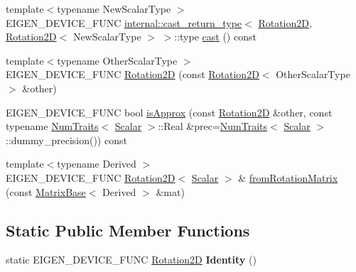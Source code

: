 \begin{DoxyCompactItemize}
\item 
{\footnotesize template$<$typename New\+Scalar\+Type $>$ }\\E\+I\+G\+E\+N\+\_\+\+D\+E\+V\+I\+C\+E\+\_\+\+F\+U\+NC \mbox{\hyperlink{struct_eigen_1_1internal_1_1cast__return__type}{internal\+::cast\+\_\+return\+\_\+type}}$<$ \mbox{\hyperlink{class_eigen_1_1_rotation2_d}{Rotation2D}}, \mbox{\hyperlink{class_eigen_1_1_rotation2_d}{Rotation2D}}$<$ New\+Scalar\+Type $>$ $>$\+::type \mbox{\hyperlink{class_eigen_1_1_rotation2_d_a7a2057f37733b0d153f542fffe8207cf}{cast}} () const
\item 
{\footnotesize template$<$typename Other\+Scalar\+Type $>$ }\\E\+I\+G\+E\+N\+\_\+\+D\+E\+V\+I\+C\+E\+\_\+\+F\+U\+NC \mbox{\hyperlink{class_eigen_1_1_rotation2_d_a28141c131bb66516477e07752278c139}{Rotation2D}} (const \mbox{\hyperlink{class_eigen_1_1_rotation2_d}{Rotation2D}}$<$ Other\+Scalar\+Type $>$ \&other)
\item 
E\+I\+G\+E\+N\+\_\+\+D\+E\+V\+I\+C\+E\+\_\+\+F\+U\+NC bool \mbox{\hyperlink{class_eigen_1_1_rotation2_d_ac70ab985fd67d3cc43ea75c33c01ae3a}{is\+Approx}} (const \mbox{\hyperlink{class_eigen_1_1_rotation2_d}{Rotation2D}} \&other, const typename \mbox{\hyperlink{struct_eigen_1_1_num_traits}{Num\+Traits}}$<$ \mbox{\hyperlink{class_eigen_1_1_rotation2_d_ac20c665ece0f197a712a2a39ae72e4e4}{Scalar}} $>$\+::Real \&prec=\mbox{\hyperlink{struct_eigen_1_1_num_traits}{Num\+Traits}}$<$ \mbox{\hyperlink{class_eigen_1_1_rotation2_d_ac20c665ece0f197a712a2a39ae72e4e4}{Scalar}} $>$\+::dummy\+\_\+precision()) const
\item 
{\footnotesize template$<$typename Derived $>$ }\\E\+I\+G\+E\+N\+\_\+\+D\+E\+V\+I\+C\+E\+\_\+\+F\+U\+NC \mbox{\hyperlink{class_eigen_1_1_rotation2_d}{Rotation2D}}$<$ \mbox{\hyperlink{class_eigen_1_1_rotation2_d_ac20c665ece0f197a712a2a39ae72e4e4}{Scalar}} $>$ \& \mbox{\hyperlink{class_eigen_1_1_rotation2_d_ab60bf3b2d7a33e8e29856f35839eba72}{from\+Rotation\+Matrix}} (const \mbox{\hyperlink{class_eigen_1_1_matrix_base}{Matrix\+Base}}$<$ Derived $>$ \&mat)
\end{DoxyCompactItemize}
\subsection*{Static Public Member Functions}
\begin{DoxyCompactItemize}
\item 
\mbox{\label{class_eigen_1_1_rotation2_d_a8bc2dda10d325f1ce5e1550e451bcd42}} 
static E\+I\+G\+E\+N\+\_\+\+D\+E\+V\+I\+C\+E\+\_\+\+F\+U\+NC \mbox{\hyperlink{class_eigen_1_1_rotation2_d}{Rotation2D}} {\bfseries Identity} ()
\end{DoxyCompactItemize}
